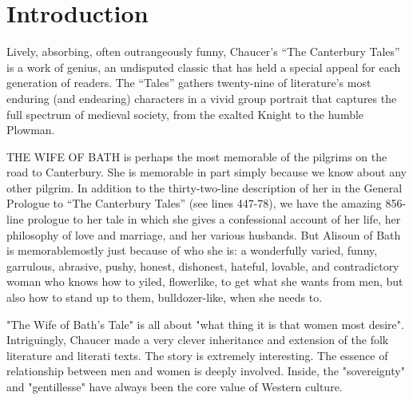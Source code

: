 \section{Introduction}
\label{Introduction}

Lively, absorbing, often outrangeously funny, Chaucer's “The Canterbury Tales”\cite{chaucer2008canterbury} is a work of genius, an undisputed classic that has held a special appeal for each generation of readers. The “Tales” gathers twenty-nine of literature's most enduring (and endearing) characters in a vivid group portrait that captures the full spectrum of medieval society, from the exalted Knight to the humble Plowman.

THE WIFE OF BATH is perhaps the most memorable of the pilgrims on the road to Canterbury. She is memorable in part simply because we know about any other pilgrim. In addition to the thirty-two-line description of her in the General Prologue to “The Canterbury Tales” (see lines 447-78), we have the amazing 856-line prologue to her tale in which she gives a confessional account of her life, her philosophy of love and marriage, and her various husbands. But Alisoun of Bath is memorablemostly just because of who she is: a wonderfully varied, funny,  garrulous, abrasive, pushy, honest, dishonest, hateful, lovable, and contradictory woman who knows how to yiled, flowerlike, to get what she wants from men, but also how to stand up to them, bulldozer-like, when she needs to.

"The Wife of Bath's Tale" is  all about "what thing it is that women most desire". Intriguingly, Chaucer made a very clever inheritance and extension of the folk literature and literati texts. The story is extremely interesting. The essence of relationship between men and women is deeply involved. Inside, the "sovereignty" and "gentillesse" have always been the core value of Western culture.\cite{owst1933literature}


